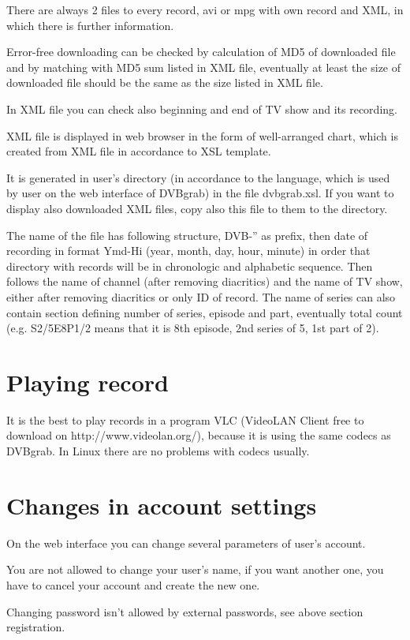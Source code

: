 There are always 2 files to every record, avi or mpg with own record and XML, in which there is further information.

Error-free downloading can be checked by calculation of MD5 of downloaded file and by matching with MD5 sum listed in XML file, eventually at least the size of downloaded file should be the same as the size listed in XML file.

In XML file you can check also beginning and end of TV show and its recording.

XML file is displayed in web browser in the form of well-arranged chart, which is created from XML file in accordance to XSL template.

It is generated in user's directory (in accordance to the language, which is used by user on the web interface of DVBgrab) in the file dvbgrab.xsl. If you want to display also downloaded XML files, copy also this file to them to the directory.

The name of the file has following structure, \quotedblbase DVB-'' as prefix, then date of recording in format Ymd-Hi (year, month, day, hour, minute) in order that directory with records will be in chronologic and alphabetic sequence. Then follows the name of channel (after removing diacritics) and the name of TV show, either after removing diacritics or only ID of record. The name of series can also contain section defining number of series, episode and part, eventually total count (e.g. S2/5E8P1/2 means that it is 8th episode, 2nd series of 5, 1st part of 2).

\section{Playing record}
It is the best to play records in a program VLC (VideoLAN Client free to download on http://www.videolan.org/), because it is using the same codecs as DVBgrab. In Linux there are no problems with codecs usually.

\section{Changes in account settings}
On the web interface you can change several parameters of user's account.

You are not allowed to change your user's name, if you want another one, you have to cancel your account and create the new one.

Changing password isn't allowed by external passwords, see above section registration.

